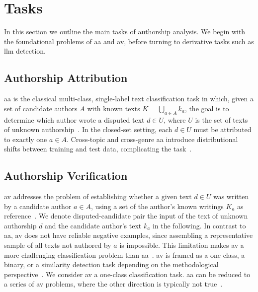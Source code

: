 \section{Tasks}

In this section we outline the main tasks of authorship analysis. 
We begin with the foundational problems of \ac{aa} and \ac{av}, before turning to derivative tasks such as \ac{llm} detection.

\subsection{Authorship Attribution}
\ac{aa} is the classical multi-class, single-label text classification task in which, given a set of candidate authors $A$ with known texts $K=\bigcup_{a\in A} k_a$, the goal is to determine which author wrote a disputed text $d \in U$, where $U$ is the set of texts of unknown authorship~\citep{koppel_authorship_2004,barlas_cross_domain_2020}. 
In the closed-set setting, each $d \in U$ must be attributed to exactly one $a \in A$. 
Cross-topic and cross-genre \ac{aa} introduce distributional shifts between training and test data, complicating the task~\citep{barlas_cross_domain_2020}.

\subsection{Authorship Verification}
\ac{av} addresses the problem of establishing whether a given text $d \in U$ was written by a candidate author $a \in A$, using a set of the author’s known writings $K_a$ as reference~\citep{koppel_authorship_2004}.
We denote disputed-candidate pair the input of the text of unknown authorship $d$ and the candidate author's text $k_a$ in the following.
In contrast to \ac{aa}, \ac{av} does not have reliable negative examples, since assembling a representative sample of all texts not authored by 
$a$ is impossible. 
This limitation makes \ac{av} a more challenging classification problem than \ac{aa}~\citep{llm_detection_av_2025,neal_surveying_2018,koppel_authorship_2004}.
\ac{av} is framed as a one-class, a binary, or a similarity detection task depending on the methodological perspective~\citep{neal_surveying_2018,koppel_authorship_2004}.  
We consider \ac{av} a one-class classification task.
\ac{aa} can be reduced to a series of \ac{av} problems, where the other direction is typically not true~\citep{barlas_cross_domain_2020,tyo_state_2022}.


